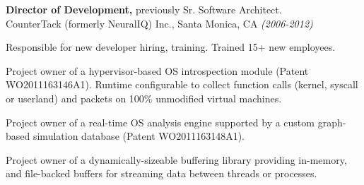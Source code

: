 \documentclass[margin]{res}
\begin{document}
\begin{resume}
{\bf Director of Development,} previously Sr. Software Architect. \\ 
CounterTack (formerly NeuralIQ) Inc., Santa Monica, CA {\em (2006-2012)}
\begin{list}{}{\leftmargin=1.5em \topsep=5pt \partopsep=0pt \parsep=2.5pt}
  \item Responsible for new developer hiring, training.  Trained 15+ 
    new employees.
  \item Project owner of a hypervisor-based OS introspection module
    (Patent WO2011163146A1). Runtime configurable to collect function
    calls (kernel, syscall or userland) and packets on 100\%
    unmodified virtual machines.
  \item Project owner of a real-time OS analysis engine supported by a
    custom graph-based simulation database (Patent WO2011163148A1).
  \item Project owner of a dynamically-sizeable buffering library
    providing in-memory, and file-backed buffers for streaming
    data between threads or processes.
\end{list}




\end{resume}
\end{document}
